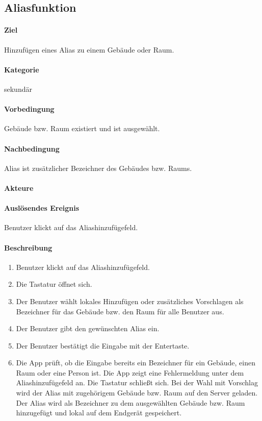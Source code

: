 \subsection{Aliasfunktion}
\label{Aliasfunktion}
\paragraph{Ziel}
Hinzufügen eines Alias zu einem Gebäude oder Raum.
\paragraph{Kategorie}
sekundär
\paragraph{Vorbedingung}
Gebäude bzw. Raum existiert und ist ausgewählt.
\paragraph{Nachbedingung}
Alias ist zusätzlicher Bezeichner des Gebäudes bzw. Raums.
\paragraph{Akteure}

\paragraph{Auslösendes Ereignis}
Benutzer klickt auf das Aliashinzufügefeld.
\paragraph{Beschreibung}
\begin{enumerate}
    \item Benutzer klickt auf das Aliashinzufügefeld.
    \item Die Tastatur öffnet sich.
    \item Der Benutzer wählt lokales Hinzufügen oder zusätzliches Vorschlagen als Bezeichner für das Gebäude bzw. den Raum für alle Benutzer aus.
    \item Der Benutzer gibt den gewünschten Alias ein.
    \item Der Benutzer bestätigt die Eingabe mit der Entertaste.
    \item Die App prüft, ob die Eingabe bereits ein Bezeichner für ein Gebäude, einen Raum oder eine Person ist.
     Die App zeigt eine Fehlermeldung unter dem Aliashinzufügefeld an.
     Die Tastatur schließt sich.
    \subitem Bei der Wahl mit Vorschlag wird der Alias mit zugehörigem Gebäude bzw. Raum auf den Server geladen.
    \subitem Der Alias wird als Bezeichner zu dem ausgewählten Gebäude bzw. Raum hinzugefügt und lokal auf dem Endgerät gespeichert.
\end{enumerate}